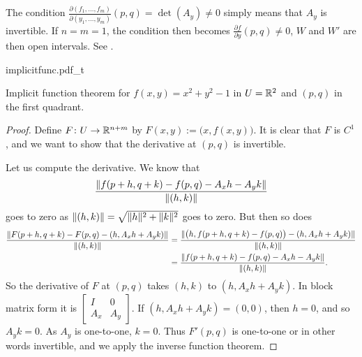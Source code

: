 The condition
$\frac{\partial(f_1,\ldots,f_m)}{\partial(y_1,\ldots,y_m)} (p,q) =
\det(A_y)  \neq 0$
simply means that $A_y$ is invertible.  If $n=m=1$, the condition then
becomes $\frac{\partial f}{\partial y}(p,q) \not= 0$, $W$ and $W'$ are then
open intervals.  See .
\begin{myfigureht}
{implicitfunc.pdf_t}
\caption{Implicit function theorem for $f(x,y) = x^2+y^2-1$ in $U={\mathbb{R}}^2$ and
$(p,q)$ in the first quadrant.\label{fig:implicitfunc}}
\end{myfigureht}

\begin{proof}
Define $F \colon U \to {\mathbb{R}}^{n+m}$ by $F(x,y) := \bigl(x,f(x,y)\bigr)$.
It is clear that $F$ is $C^1$, and we want to show that the derivative
at $(p,q)$ is invertible.

Let us compute the derivative.  We know that
\begin{equation*}
\frac{\lVert {f(p+h,q+k) - f(p,q) - A_x h - A_y k} \rVert}{\lVert {(h,k)} \rVert}
\end{equation*}
goes to zero as $\lVert {(h,k)} \rVert = \sqrt{\lVert {h} \rVert^2+\lVert {k} \rVert^2}$ goes to zero.
But then so does
\begin{equation*}
\begin{split}
\frac{\lVert {F(p+h,q+k)-F(p,q) - (h,A_x h+A_y k)} \rVert}{\lVert {(h,k)} \rVert}
& =
\frac{\lVert {\bigl(h,f(p+h,q+k)-f(p,q)\bigr) - (h,A_x h+A_y
k)} \rVert}{\lVert {(h,k)} \rVert}
\\
& =
\frac{\lVert {f(p+h,q+k) - f(p,q) - A_x h - A_y k} \rVert}{\lVert {(h,k)} \rVert} .
\end{split}
\end{equation*}
So the derivative of $F$ at $(p,q)$ takes $(h,k)$ to $(h,A_x h+A_y k)$.
In block matrix form it is
$\left[\begin{smallmatrix}I & 0\\A_x & A_y\end{smallmatrix}\right]$.  If 
$(h,A_x h+A_y k) = (0,0)$, then $h=0$, and so $A_y k = 0$.  As $A_y$ is
one-to-one, $k=0$.  Thus $F'(p,q)$ is one-to-one or in other
words invertible, and we apply the inverse function theorem.


\end{proof}
